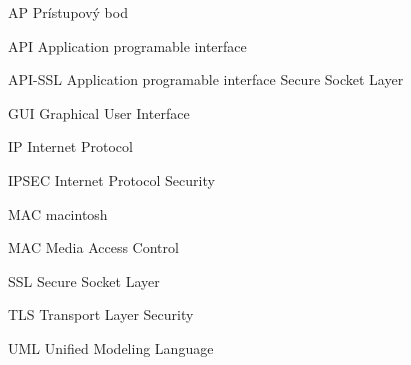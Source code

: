 \begin{seznamzkratek}{90}
	
		{AP}								%
		{Prístupový bod}	
	
		{API}								%
		{Application programable interface}
	
	
		{API-SSL}								%
		{Application programable interface Secure Socket Layer}	
	
		{GUI}								%
		{Graphical User Interface}	
	
		{IP}								%
		{Internet Protocol}	
	
		{IPSEC}								%
		{Internet Protocol Security}
	
		{MAC}								%
		{macintosh}
		
		{MAC}								%
		{Media Access Control}	
	
		{SSL}								%
		{Secure Socket Layer}
	
		{TLS}								%
		{Transport Layer Security}	
	
		{UML}								%
		{Unified Modeling Language}

												
\end{seznamzkratek}
